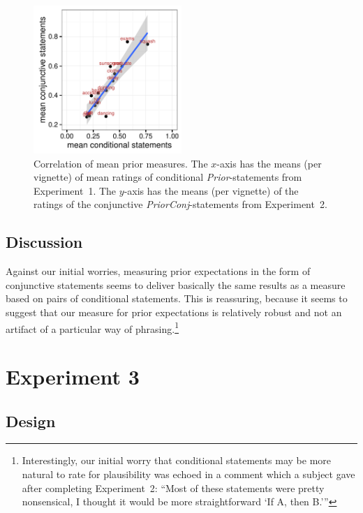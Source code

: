 \documentclass[12pt]{article}
\begin{document}
\begin{figure}
  \centering
  \includegraphics[width=0.5\textwidth]{pics/correlationPriorMeasuresExp1and5.pdf}
  \caption{Correlation of mean prior measures. The $x$-axis has the means (per vignette) of
    mean ratings of conditional \emph{Prior}-statements from Experiment~1. The $y$-axis has the means (per
    vignette) of the ratings of the conjunctive \emph{PriorConj}-statements from Experiment~2.}
  \label{fig:correlationPriorMeasures}
\end{figure}

\subsection*{Discussion}

Against our initial worries, measuring prior expectations in the form of conjunctive statements
seems to deliver basically the same results as a measure based on pairs of conditional
statements. This is reassuring, because it seems to suggest that our measure for prior
expectations is relatively robust and not an artifact of a particular way of
phrasing.\footnote{Interestingly, our initial worry that conditional statements may be more
  natural to rate for plausibility was echoed in a comment which a subject gave after
  completing Experiment~2: ``Most of these statements were pretty nonsensical, I thought it
  would be more straightforward `If A, then B.'''}


\section{Experiment 3}

\subsection*{Design}
\end{document}
